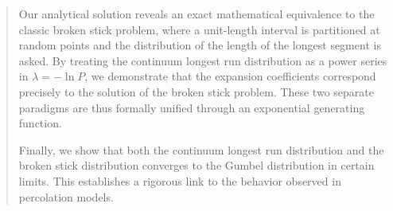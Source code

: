\documentclass[oneside,12pt,final]{ucthesis-CA2012}
\newcommand{\lmd}{\lambda}
\begin{document}
\begin{frontmatter}
\begin{abstract}
		Our analytical solution reveals an exact mathematical equivalence to the classic broken stick problem,
		where a unit-length interval is partitioned at random points and the distribution
		of the length of the longest segment is asked.
		By treating the continuum longest run distribution as a power series in $\lmd=-\ln P$,
		we demonstrate that the expansion coefficients correspond precisely to the solution of
		the broken stick problem.
		These two separate paradigms are thus formally unified through an exponential generating function.

		Finally, we show that both the continuum longest run distribution
		and the broken stick distribution converges to the Gumbel distribution in certain limits.
		This establishes a rigorous link to the behavior observed in percolation models.
	\end{abstract}

	\tableofcontents
\end{frontmatter}
\end{document}
